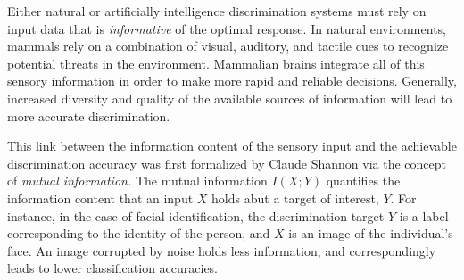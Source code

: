 Either natural or artificially intelligence discrimination systems
must rely on input data that is \emph{informative} of the optimal
response.  In natural environments, mammals rely on a combination of
visual, auditory, and tactile cues to recognize potential threats in
the environment.  Mammalian brains integrate all of this sensory
information in order to make more rapid and reliable decisions.
Generally, increased diversity and quality of the available sources of
information will lead to more accurate discrimination.

This link between the information content of the sensory input and the
achievable discrimination accuracy was first formalized by Claude
Shannon via the concept of \emph{mutual information.}  The mutual
information $I(X; Y)$ quantifies the information content that an input
$X$ holds abut a target of interest, $Y$.  For instance, in the case
of facial identification, the discrimination target $Y$ is a label
corresponding to the identity of the person, and $X$ is an image of
the individual's face.  An image corrupted by noise holds less
information, and correspondingly leads to lower classification
accuracies.







